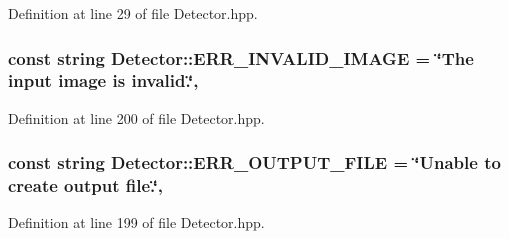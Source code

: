 Definition at line 29 of file Detector.\-hpp.

\hypertarget{classmultiscale_1_1analysis_1_1Detector_aa5dc8982745f567379e0eccd416c6820}{
\subsubsection[{E\-R\-R\-\_\-\-I\-N\-V\-A\-L\-I\-D\-\_\-\-I\-M\-A\-G\-E}]{\setlength{\rightskip}{0pt plus 5cm}const string Detector\-::\-E\-R\-R\-\_\-\-I\-N\-V\-A\-L\-I\-D\-\_\-\-I\-M\-A\-G\-E = \char`\"{}The input {\bf image} is invalid.\char`\"{}\hspace{0.3cm}{\ttfamily [static]}, {\ttfamily [protected]}}}\label{classmultiscale_1_1analysis_1_1Detector_aa5dc8982745f567379e0eccd416c6820}


Definition at line 200 of file Detector.\-hpp.

\hypertarget{classmultiscale_1_1analysis_1_1Detector_aab6b3a68e93cad9a93885e52f1c2ce04}{
\subsubsection[{E\-R\-R\-\_\-\-O\-U\-T\-P\-U\-T\-\_\-\-F\-I\-L\-E}]{\setlength{\rightskip}{0pt plus 5cm}const string Detector\-::\-E\-R\-R\-\_\-\-O\-U\-T\-P\-U\-T\-\_\-\-F\-I\-L\-E = \char`\"{}Unable to create output file.\char`\"{}\hspace{0.3cm}{\ttfamily [static]}, {\ttfamily [protected]}}}\label{classmultiscale_1_1analysis_1_1Detector_aab6b3a68e93cad9a93885e52f1c2ce04}


Definition at line 199 of file Detector.\-hpp.

